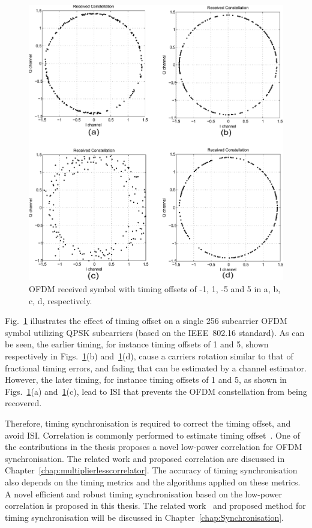 \begin{figure}
	\centerline{\includegraphics [width=0.8\columnwidth] {Figures/timeoff.pdf} }
	\caption{OFDM received symbol with timing offsets of -1, 1, -5 and 5 in a, b, c, d, respectively.}
	\label{fig:Timingoffsetconstellation}
\end{figure}

Fig.~\ref{fig:Timingoffsetconstellation} illustrates the effect of timing offset on a single 256 subcarrier OFDM symbol utilizing QPSK subcarriers (based on the IEEE~802.16 standard).
As can be seen, the earlier timing, for instance timing offsets of 1 and 5, shown respectively in Figs.~\ref{fig:Timingoffsetconstellation}(b) and~\ref{fig:Timingoffsetconstellation}(d), cause a carriers rotation similar to that of fractional timing errors, and fading that can be estimated by a channel estimator.
However, the later timing, for instance timing offsets of 1 and 5, as shown in Figs.~\ref{fig:Timingoffsetconstellation}(a) and~\ref{fig:Timingoffsetconstellation}(c), lead to ISI that prevents the OFDM constellation from being recovered.

Therefore, timing synchronisation is required to correct the timing offset, and avoid ISI.
Correlation is commonly performed to estimate timing offset~\cite{Dick2003,Fort2003,Wang2004}. One of the contributions in the thesis proposes a novel low-power correlation for OFDM synchronisation. The related work and proposed correlation are discussed in Chapter~\ref{chap:multiplierlesscorrelator}.
The accuracy of timing synchronisation also depends on the timing metrics and the algorithms applied on these metrics. A novel efficient and robust timing synchronisation based on the low-power correlation is proposed in this thesis. The related work~\cite{Schmidl1997,Kishore2006,Guffey2007,Huang2010,Recio2010} and proposed method for timing synchronisation will be discussed in Chapter~\ref{chap:Synchronisation}.
